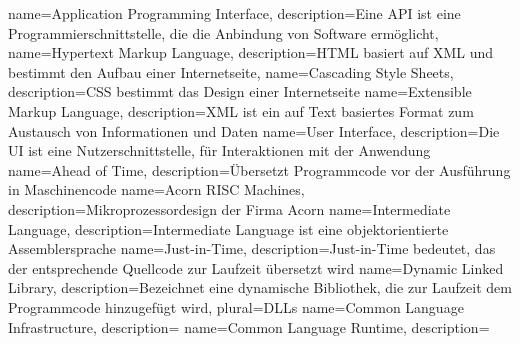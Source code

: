  {
	name={Application Programming Interface},
	description={Eine API ist eine Programmierschnittstelle, die die Anbindung von Software ermöglicht},
}
{
	name=Hypertext Markup Language,
	description={HTML basiert auf XML und bestimmt den Aufbau einer Internetseite},
}
{
	name=Cascading Style Sheets,
	description={CSS bestimmt das Design einer Internetseite}
}
{
	name=Extensible Markup Language,
	description={XML ist ein auf Text basiertes Format zum Austausch von Informationen und Daten}
}
{
	name=User Interface,
	description={Die UI ist eine Nutzerschnittstelle, für Interaktionen mit der Anwendung}
}
{
	name=Ahead of Time,
	description={Übersetzt Programmcode vor der Ausführung in Maschinencode}
}
{
	name=Acorn RISC Machines,
	description={Mikroprozessordesign der Firma Acorn}
}
{
	name=Intermediate Language,
	description={Intermediate Language ist eine objektorientierte Assemblersprache}
}
{
	name=Just-in-Time,
	description={Just-in-Time bedeutet, das der entsprechende Quellcode zur Laufzeit übersetzt wird}
}
{
	name=Dynamic Linked Library,
	description={Bezeichnet eine dynamische Bibliothek, die zur Laufzeit dem Programmcode hinzugefügt wird},
	plural=DLLs
}
{
	name=Common Language Infrastructure,
	description={}
}
{
	name=Common Language Runtime,
	description={}
}
